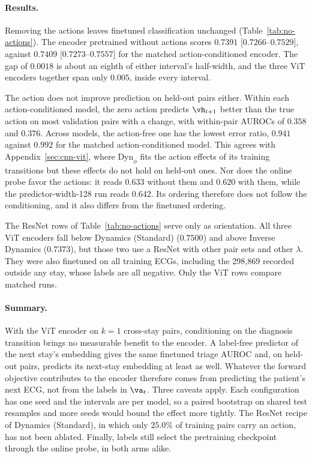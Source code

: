 \paragraph{Results.} Removing the actions leaves finetuned classification unchanged (Table~\ref{tab:no-actions}). The encoder pretrained without actions scores $0.7391$ $[0.7266$--$0.7529]$, against $0.7409$ $[0.7273$--$0.7557]$ for the matched action-conditioned encoder. The gap of $0.0018$ is about an eighth of either interval's half-width, and the three ViT encoders together span only $0.005$, inside every interval.

The action does not improve prediction on held-out pairs either. Within each action-conditioned model, the zero action predicts $\vh_{t+1}$ better than the true action on most validation pairs with a change, with within-pair AUROCs of $0.358$ and $0.376$. Across models, the action-free one has the lowest error ratio, $0.941$ against $0.992$ for the matched action-conditioned model. This agrees with Appendix~\ref{sec:cnn-vit}, where $\text{Dyn}_\phi$ fits the action effects of its training transitions but these effects do not hold on held-out ones. Nor does the online probe favor the actions: it reads $0.633$ without them and $0.620$ with them, while the predictor-width-128 run reads $0.642$. Its ordering therefore does not follow the conditioning, and it also differs from the finetuned ordering.

The ResNet rows of Table~\ref{tab:no-actions} serve only as orientation. All three ViT encoders fall below Dynamics (Standard) ($0.7500$) and above Inverse Dynamics ($0.7373$), but those two use a ResNet with other pair sets and other $\lambda$. They were also finetuned on all training ECGs, including the 298{,}869 recorded outside any stay, whose labels are all negative. Only the ViT rows compare matched runs.

\paragraph{Summary.} With the ViT encoder on $k=1$ cross-stay pairs, conditioning on the diagnosis transition brings no measurable benefit to the encoder. A label-free predictor of the next stay's embedding gives the same finetuned triage AUROC and, on held-out pairs, predicts its next-stay embedding at least as well. Whatever the forward objective contributes to the encoder therefore comes from predicting the patient's next ECG, not from the labels in $\va_t$. Three caveats apply. Each configuration has one seed and the intervals are per model, so a paired bootstrap on shared test resamples and more seeds would bound the effect more tightly. The ResNet recipe of Dynamics (Standard), in which only $25.0\%$ of training pairs carry an action, has not been ablated. Finally, labels still select the pretraining checkpoint through the online probe, in both arms alike.

